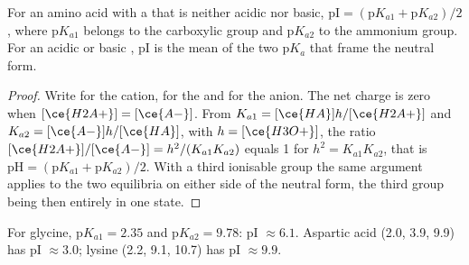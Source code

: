 \begin{proposition}\label{prop:b2:biomolecules:pi}
For an amino acid with a  that is neither acidic nor basic, $\mathrm{pI} = (\mathrm pK_{a1} +
\mathrm pK_{a2})/2$, where $\mathrm pK_{a1}$ belongs to the carboxylic group and $\mathrm pK_{a2}$ to the
ammonium group. For an acidic or basic , pI is the mean of the two $\mathrm pK_a$ that frame the
neutral form.
\end{proposition}

\begin{proof}
Write  for the cation,  for the  and  for the anion. The net charge is
zero when $[\ce{H2A+}] = [\ce{A-}]$. From $K_{a1} = [\ce{HA}]h/[\ce{H2A+}]$ and $K_{a2} =
[\ce{A-}]h/[\ce{HA}]$, with $h = [\ce{H3O+}]$, the ratio $[\ce{H2A+}]/[\ce{A-}] = h^2/(K_{a1}K_{a2})$
equals 1 for $h^2 = K_{a1}K_{a2}$, that is $\mathrm{pH} = (\mathrm pK_{a1} + \mathrm pK_{a2})/2$. With a
third ionisable group the same argument applies to the two equilibria on either side of the neutral
form, the third group being then entirely in one state.
\end{proof}

For glycine, $\mathrm pK_{a1} = 2.35$ and $\mathrm pK_{a2} = 9.78$: pI $\approx 6.1$. Aspartic acid
(2.0, 3.9, 9.9) has pI $\approx 3.0$; lysine (2.2, 9.1, 10.7) has pI $\approx 9.9$.


